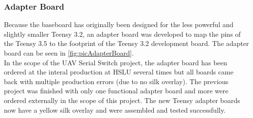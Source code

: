\subsubsection{Adapter Board}
%
Because the baseboard has originally been designed for the less powerful and slightly smaller Teensy 3.2, an adapter board was developed to map the pins of the Teensy 3.5 to the footprint of the Teensy 3.2 development board. The adapter board can be seen in \autoref{fig:picAdapterBoard}.\\
In the scope of the UAV Serial Switch project, the adapter board has been ordered at the interal production at HSLU several times but all boards came back with  multiple production errors (due to no silk overlay). The previous project was finished with only one functional adapter board and more were ordered externally in the scope of this project. The new Teensy adapter boards now have a yellow silk overlay and were assembled and tested successfully.
%
%
%
